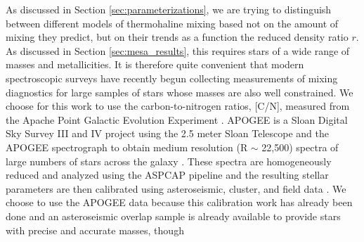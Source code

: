
As discussed in Section \ref{sec:parameterizations}, we are trying to distinguish between different models of thermohaline mixing based not on the amount of mixing they predict, but on their trends as a function the reduced density ratio $r$. As discussed in Section \ref{sec:mesa_results}, this requires stars of a wide range of masses and metallicities. It is therefore quite convenient that 
modern spectroscopic surveys have recently begun collecting measurements of mixing diagnostics for large samples of stars whose masses are also well constrained. 
%
We choose for this work to use the carbon-to-nitrogen ratios, [C/N], measured from the Apache Point Galactic Evolution Experiment \citep[APOGEE, ][]{Majewski2017}. APOGEE is a Sloan Digital Sky Survey III and IV \citep{Blanton2017} project using the 2.5 meter Sloan Telescope \citep{Gunn2006} and the APOGEE spectrograph \citep{Wilson2019} to obtain medium resolution (R $\sim$ 22,500) spectra of large numbers of stars across the galaxy \citep{Zasowski2017, Beaton2021,Santana2021}. These spectra are homogeneously reduced and analyzed using the ASPCAP pipeline \citep{Nidever2015, Zamora2015, GarciaPerez2016} and the resulting stellar parameters are then calibrated using asteroseismic, cluster, and field data \citep{Holtzman2015,Holtzman2018, Jonsson2020}. We choose to use the APOGEE data because this calibration work has already been done and an asteroseismic overlap sample is already available to provide stars with precise and accurate masses, though %
